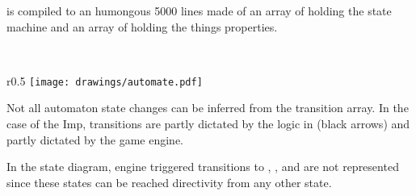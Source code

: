  is compiled to an humongous 5000 lines  made of an array of  holding the state machine and an array of  holding the things properties.\\
\par
{}\\
\par
\begin{wrapfigure}[9]{r}{0.5\textwidth}
\centering
\texttt{[image: drawings/automate.pdf]}
\end{wrapfigure}
Not all automaton state changes can be inferred from the transition array. In the case of the Imp, transitions are partly dictated by the logic in  (black arrows) and partly dictated by the game engine.\\
\par
 In the state diagram, engine triggered transitions to , , and  are not represented since these states can be reached directivity from any other state.
\par

\pagebreak

